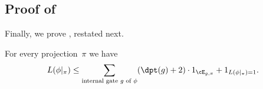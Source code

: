 \subsection{\label{subsec:reduction-to-size-2-with-substitution}Proof of }

Finally, we prove ,
restated next.
\begin{restated}{}
For every projection~$\pi$ we have 
\begin{equation}
L(\phi|_{\pi})\le\sum_{\text{internal gate \ensuremath{g} of \ensuremath{\phi}}}(\dpt(g)+2)\cdot1_{\cE_{g,\pi}}+1_{L(\phi|_{\pi})=1}.\label{eq:reduction-to-size-2-with-substitution}
\end{equation}
\end{restated}

